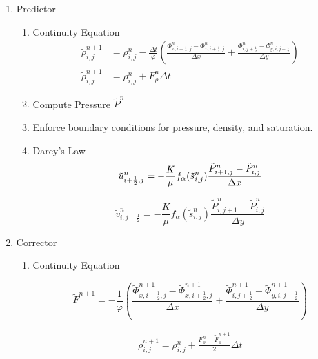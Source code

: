 \documentclass[a4paper,12pt]{article}
\begin{document}
\begin{enumerate}
    \item Predictor
        \begin{enumerate}
            \item Continuity Equation
\begin{align*}
    \tilde \rho_{i, j}^{n+1} &= \rho_{i, j}^n
    - \frac{\Delta t}{\varphi} \left( 
  \frac{\Phi_{x, i - \frac{1}{2}, j}^n -
        \Phi_{x, i + \frac{1}{2},j}^n}{\Delta x}
+ \frac{\Phi_{i, j + \frac{1}{2}}^n - \Phi_{y, i, j - \frac{1}{2}}^n}
{\Delta y}
\right) \\
    \tilde \rho_{i, j}^{n + 1} &= \rho_{i, j}^n + F_\rho^n \Delta t 
\end{align*}

            \item Compute Pressure \(\tilde P^n\)
            \item Enforce boundary conditions for pressure,
                density, and saturation.

            \item Darcy's Law
\[
    \tilde u_{i + \frac{1}{2},j}^n = -\frac{K}{\mu}
    f_\alpha (\tilde s_{i, j}^n)
    \frac{\tilde P_{i + 1, j}^n - \tilde P_{i, j}^n}{\Delta x} \\
\] 

\[
    \tilde v_{i, j + \frac{1}{2}}^n = -\frac{K}{\mu}
    f_\alpha(\tilde s_{i, j}^n)
    \frac{\tilde P_{i, j + 1}^n - \tilde P_{i, j}^n}{\Delta y}
\] 
        \end{enumerate}

    \item Corrector
        \begin{enumerate}
            \item Continuity Equation

\[
    \tilde F^{n + 1} = -\frac{1}{\varphi} \left( 
        \frac{\tilde\Phi_{x, i - \frac{1}{2}, j}^{n + 1} -
        \tilde\Phi_{x, i + \frac{1}{2},j}^{n + 1}}{\Delta x}
        + \frac{\tilde\Phi_{i, j + \frac{1}{2}}^{n + 1}
        - \tilde\Phi_{y, i, j - \frac{1}{2}}^{n + 1}}{\Delta y}
    \right)
\]

\begin{align*}
    \rho_{i, j}^{n + 1} = \rho_{i, j}^n + \frac{F_\rho^n
    + \tilde F_\rho^{n+1} }{2} \Delta t
\end{align*}


\end{enumerate}
\end{enumerate}
\end{document}
